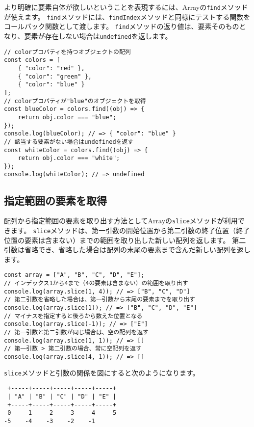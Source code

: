 より明確に要素自体が欲しいということを表現するには、Arrayの\texttt{find}メソッド\,\protect{}\,が使えます。
\texttt{find}メソッドには、\texttt{findIndex}メソッドと同様にテストする関数をコールバック関数として渡します。
\texttt{find}メソッドの返り値は、要素そのものとなり、要素が存在しない場合は\texttt{undefined}を返します。

\begin{lstlisting}
// colorプロパティを持つオブジェクトの配列
const colors = [
    { "color": "red" },
    { "color": "green" },
    { "color": "blue" }
];
// colorプロパティが"blue"のオブジェクトを取得
const blueColor = colors.find((obj) => {
    return obj.color === "blue";
});
console.log(blueColor); // => { "color": "blue" }
// 該当する要素がない場合はundefinedを返す
const whiteColor = colors.find((obj) => {
    return obj.color === "white";
});
console.log(whiteColor); // => undefined
\end{lstlisting}

\hypertarget{slice}{%
\subsection{指定範囲の要素を取得}\label{slice}}

配列から指定範囲の要素を取り出す方法としてArrayの\texttt{slice}メソッドが利用できます。
\texttt{slice}メソッドは、第一引数の開始位置から第二引数の終了位置（終了位置の要素は含まない）までの範囲を取り出した新しい配列を返します。
第二引数は省略でき、省略した場合は配列の末尾の要素まで含んだ新しい配列を返します。

\begin{lstlisting}
const array = ["A", "B", "C", "D", "E"];
// インデックス1から4まで（4の要素は含まない）の範囲を取り出す
console.log(array.slice(1, 4)); // => ["B", "C", "D"]
// 第二引数を省略した場合は、第一引数から末尾の要素までを取り出す
console.log(array.slice(1)); // => ["B", "C", "D", "E"]
// マイナスを指定すると後ろから数えた位置となる
console.log(array.slice(-1)); // => ["E"]
// 第一引数と第二引数が同じ場合は、空の配列を返す
console.log(array.slice(1, 1)); // => []
// 第一引数 > 第二引数の場合、常に空配列を返す
console.log(array.slice(4, 1)); // => []
\end{lstlisting}

\texttt{slice}メソッドと引数の関係を図にすると次のようになります。

\begin{lstlisting}
 +-----+-----+-----+-----+-----+
 | "A" | "B" | "C" | "D" | "E" |
 +-----+-----+-----+-----+-----+
 0     1     2     3     4     5
-5    -4    -3    -2    -1
\end{lstlisting}

